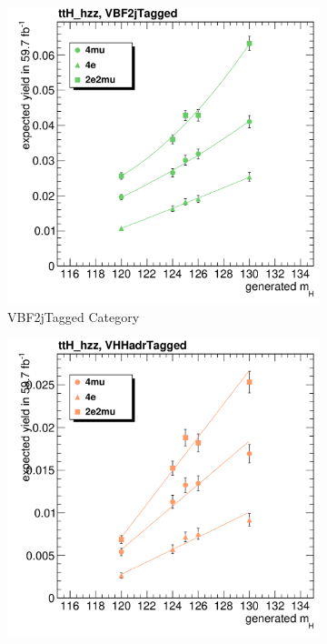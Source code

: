 \begin{figure}[h]
\begin{subfigure}[b]{0.3\textwidth}
         \includegraphics[width=\textwidth]{images/cFits_ttH_hzz_VBF2jTagged_.png}
         \caption{VBF2jTagged Category}
         \end{subfigure}
          \hfill
         \begin{subfigure}[b]{0.3\textwidth}
         \includegraphics[width=\textwidth]{images/cFits_ttH_hzz_VHHadrTagged_.png}

\end{subfigure}
\end{figure}
